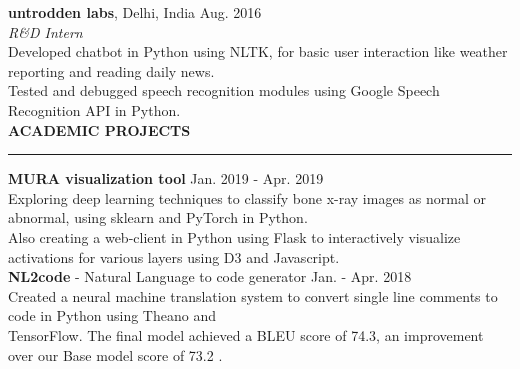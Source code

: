 \documentclass[a4paper]{article}
\newcommand{\myline}{\par
  \kern2pt %
  \hrule height 0.5pt
  \kern2pt %
}
\newcommand{\mybullet}{
	\indent \textbullet \hspace*{2mm}
}
\begin{document}

	\noindent
	\textbf{untrodden labs}, Delhi, India \hfill Aug. 2016 \\
        \textit{R\&D Intern}\\
        \mybullet Developed chatbot in Python using NLTK, for basic user interaction like 
        weather reporting and reading daily news. \\
        \mybullet Tested and debugged speech recognition modules using Google Speech 
        Recognition API in Python. \\
	
	
\noindent
{\large \textbf{ACADEMIC PROJECTS}}
\myline 
\smallskip
      
      \noindent
      \textbf{MURA visualization tool}
      \hfill Jan. 2019 - Apr. 2019 \\
      \mybullet Exploring deep learning techniques to classify bone x-ray 
      images as normal or abnormal, using sklearn and PyTorch in Python. \\ 
      \hspace*{9mm} Also creating a web-client in Python using Flask to interactively visualize 
      activations for various layers using D3 and Javascript. \\

			\noindent
			\textbf{NL2code} - Natural Language to code generator
			\hfill Jan. - Apr. 2018 \\
			\mybullet Created a neural machine translation system to convert single line comments 
			to code in Python using Theano and \\ 
			\hspace*{9mm} TensorFlow. The final model achieved a BLEU score of 74.3, an improvement 
			over our Base model score of 73.2 . \\
\end{document}
